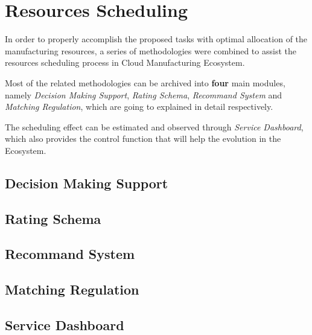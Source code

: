 \section{Resources Scheduling} %
\label{sec:model}

In order to properly accomplish the proposed tasks with optimal allocation of the manufacturing resources, a series of methodologies were combined to assist the resources scheduling process in Cloud Manufacturing Ecosystem.

Most of the related methodologies can be archived into \textbf{four} main modules, namely \textit{Decision Making Support}, \textit{Rating Schema}, \textit{Recommand System} and \textit{Matching Regulation}, which are going to explained in detail respectively.

The scheduling effect can be estimated and observed through \textit{Service Dashboard}, which also provides the control function that will help the evolution in the Ecosystem.

\subsection{Decision Making Support} %
\label{sub:decision_making_support}


\subsection{Rating Schema} %
\label{sub:rating_schema}


\subsection{Recommand System} %
\label{sub:recommand_system}


\subsection{Matching Regulation} %
\label{sub:matching_regulation}


\subsection{Service Dashboard} %
\label{sub:service_dashboard}

